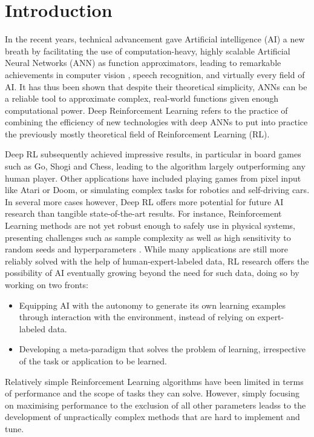 \section{Introduction}
\label{sec:intro}
In the recent years, technical advancement gave Artificial intelligence (AI) a new breath by facilitating the use of computation-heavy, highly scalable Artificial Neural Networks (ANN) as function approximators, leading to remarkable achievements in computer vision \cite{krizhevsky2012imagenet}, speech recognition\cite{dahl2011context}, and virtually every field of AI. It has thus been shown that despite their theoretical simplicity, ANNs can be a reliable tool to approximate complex, real-world functions given enough computational power. Deep Reinforcement Learning refers to the practice of combining the efficiency of new technologies with deep ANNs to put into practice the previously mostly theoretical field of Reinforcement Learning (RL). 

Deep RL subsequently achieved impressive results, in particular in board games such as Go, Shogi and Chess\cite{silver2018general}, leading to the algorithm largely outperforming any human player. Other applications have included playing games from pixel input like Atari\cite{mnih2015human} or Doom\cite{kempka2016vizdoom}, or simulating complex tasks for robotics\cite{levine2016end} and self-driving cars\cite{pan2017virtual}. In several more cases however, Deep RL offers more potential for future AI research than tangible state-of-the-art results. For instance, Reinforcement Learning methods are not yet robust enough to safely use in physical systems, presenting challenges such as sample complexity as well as high sensitivity to random seeds and hyperparameters\cite{henderson2018deep} \cite{engstrom2020implementation} \cite{dossa2021empirical}.
While many applications are still more reliably solved with the help of human-expert-labeled data,  RL research offers the possibility of AI eventually growing beyond the need for such data, doing so by working on two fronts:
\begin{itemize}
\item Equipping AI with the autonomy to generate its own learning examples through interaction with the environment, instead of relying on expert-labeled data.
\item Developing a meta-paradigm that solves the problem of learning, irrespective of the task or application to be learned.
\end{itemize}

Relatively simple Reinforcement Learning algorithms have been limited in terms of performance and the scope of tasks they can solve. However, simply focusing on maximising performance to the exclusion of all other parameters leadss to the development of unpractically complex methods that are hard to implement and tune.%


